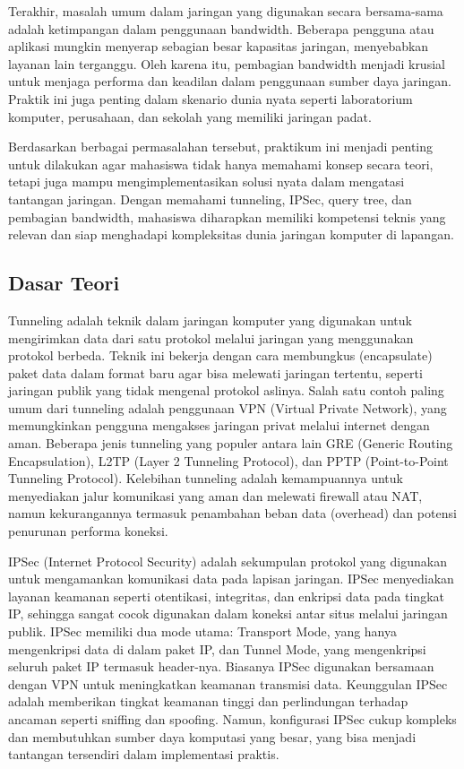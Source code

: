 Terakhir, masalah umum dalam jaringan yang digunakan secara bersama-sama adalah ketimpangan dalam penggunaan bandwidth. Beberapa pengguna atau aplikasi mungkin menyerap sebagian besar kapasitas jaringan, menyebabkan layanan lain terganggu. Oleh karena itu, pembagian bandwidth menjadi krusial untuk menjaga performa dan keadilan dalam penggunaan sumber daya jaringan. Praktik ini juga penting dalam skenario dunia nyata seperti laboratorium komputer, perusahaan, dan sekolah yang memiliki jaringan padat.

Berdasarkan berbagai permasalahan tersebut, praktikum ini menjadi penting untuk dilakukan agar mahasiswa tidak hanya memahami konsep secara teori, tetapi juga mampu mengimplementasikan solusi nyata dalam mengatasi tantangan jaringan. Dengan memahami tunneling, IPSec, query tree, dan pembagian bandwidth, mahasiswa diharapkan memiliki kompetensi teknis yang relevan dan siap menghadapi kompleksitas dunia jaringan komputer di lapangan.

\subsection{Dasar Teori}
Tunneling adalah teknik dalam jaringan komputer yang digunakan untuk mengirimkan data dari satu protokol melalui jaringan yang menggunakan protokol berbeda. Teknik ini bekerja dengan cara membungkus (encapsulate) paket data dalam format baru agar bisa melewati jaringan tertentu, seperti jaringan publik yang tidak mengenal protokol aslinya. Salah satu contoh paling umum dari tunneling adalah penggunaan VPN (Virtual Private Network), yang memungkinkan pengguna mengakses jaringan privat melalui internet dengan aman. Beberapa jenis tunneling yang populer antara lain GRE (Generic Routing Encapsulation), L2TP (Layer 2 Tunneling Protocol), dan PPTP (Point-to-Point Tunneling Protocol). Kelebihan tunneling adalah kemampuannya untuk menyediakan jalur komunikasi yang aman dan melewati firewall atau NAT, namun kekurangannya termasuk penambahan beban data (overhead) dan potensi penurunan performa koneksi.

IPSec (Internet Protocol Security) adalah sekumpulan protokol yang digunakan untuk mengamankan komunikasi data pada lapisan jaringan. IPSec menyediakan layanan keamanan seperti otentikasi, integritas, dan enkripsi data pada tingkat IP, sehingga sangat cocok digunakan dalam koneksi antar situs melalui jaringan publik. IPSec memiliki dua mode utama: Transport Mode, yang hanya mengenkripsi data di dalam paket IP, dan Tunnel Mode, yang mengenkripsi seluruh paket IP termasuk header-nya. Biasanya IPSec digunakan bersamaan dengan VPN untuk meningkatkan keamanan transmisi data. Keunggulan IPSec adalah memberikan tingkat keamanan tinggi dan perlindungan terhadap ancaman seperti sniffing dan spoofing. Namun, konfigurasi IPSec cukup kompleks dan membutuhkan sumber daya komputasi yang besar, yang bisa menjadi tantangan tersendiri dalam implementasi praktis.

